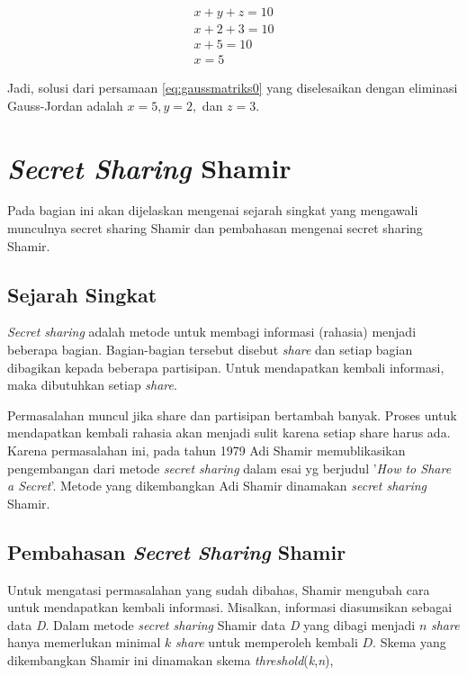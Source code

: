 \begin{gather}
	x + y + z = 10 \nonumber \\
	x + 2 + 3 = 10 \nonumber \\
	x + 5 = 10 \nonumber \\
	x = 5 \label{eq:gaussmatriks8}
\end{gather}

Jadi, solusi dari persamaan \ref{eq:gaussmatriks0} yang diselesaikan dengan eliminasi Gauss-Jordan adalah \begin{math}x=5, y=2,\end{math} dan \begin{math}z=3\end{math}.

\section{\textit{Secret Sharing} Shamir}

Pada bagian ini akan dijelaskan mengenai sejarah singkat yang mengawali munculnya secret sharing Shamir dan pembahasan mengenai secret sharing Shamir.

\subsection{Sejarah Singkat}

\textit{Secret sharing} adalah metode untuk membagi informasi (rahasia) menjadi beberapa bagian. Bagian-bagian tersebut disebut \textit{share} dan setiap bagian dibagikan kepada beberapa partisipan. Untuk mendapatkan kembali informasi, maka dibutuhkan setiap \textit{share}.

Permasalahan muncul jika share dan partisipan bertambah banyak. Proses untuk mendapatkan kembali rahasia akan menjadi sulit karena setiap share harus ada. Karena permasalahan ini, pada tahun 1979 Adi Shamir memublikasikan pengembangan dari metode \textit{secret sharing} dalam esai yg berjudul '\textit{How to Share a Secret}'\cite{shamir1979share}. Metode yang dikembangkan Adi Shamir dinamakan \textit{secret sharing} Shamir.

\subsection{Pembahasan \textit{Secret Sharing} Shamir}

Untuk mengatasi permasalahan yang sudah dibahas, Shamir mengubah cara untuk mendapatkan kembali informasi. Misalkan, informasi diasumsikan sebagai data \textit{D}. Dalam metode \textit{secret sharing} Shamir data \textit{D} yang dibagi menjadi \begin{math}n\end{math} \textit{share} hanya memerlukan minimal \begin{math}k\end{math} \textit{share} untuk memperoleh kembali \begin{math}D\end{math}. Skema yang dikembangkan Shamir ini dinamakan skema \textit{threshold}(\textit{k},\textit{n}),

